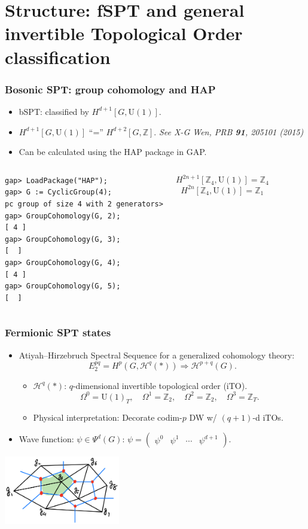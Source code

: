 \documentclass[xcolor=table, aspectratio=169]{beamer}
\newcommand{\uone}{\mathrm U(1)}
\begin{document}
\section{Structure: fSPT and general invertible Topological Order classification}

\begin{frame}[fragile]
	\frametitle{Bosonic SPT: group cohomology and HAP}
	\begin{itemize}
		\item bSPT: classified by $H^{d+1}[G,\uone]$.
		\item $H^{d+1}[G,\uone]$ ``='' $H^{d+2}[G,\mathbb Z]$. \emph{See X-G Wen, PRB \textbf{91}, 205101 (2015)}
                \item Can be calculated using the HAP package in GAP.
	\end{itemize}
	\begin{columns}
	\begin{lstlisting}[basicstyle=\footnotesize]
gap> LoadPackage("HAP");
gap> G := CyclicGroup(4);
pc group of size 4 with 2 generators>
gap> GroupCohomology(G, 2);
[ 4 ]
gap> GroupCohomology(G, 3);
[  ]
gap> GroupCohomology(G, 4);
[ 4 ]
gap> GroupCohomology(G, 5);
[  ]
\end{lstlisting}
	\[H^{2n+1}[\mathbb Z_4,\uone] = \mathbb Z_4\]
	\[H^{2n}[\mathbb Z_4,\uone] = \mathbb Z_1\]
	\end{columns}
\end{frame}

\begin{frame}
  \frametitle{Fermionic SPT states}
  \begin{itemize}
  \item Atiyah–Hirzebruch Spectral Sequence for a generalized cohomology theory:
    \[E_2^{pq} = H^p(G, \mathcal H^q(*)) \Rightarrow \mathcal H^{p+q}(G).\]
    \begin{itemize}
    \item $\mathcal H^q(*)$: $q$-dimensional invertible topological order (iTO).
    \[\Omega^0=\uone_T,\quad\Omega^1=\mathbb Z_2,\quad\Omega^2=\mathbb Z_2,\quad\Omega^3=\mathbb Z_T.\]
    \item Physical interpretation: Decorate codim-$p$ DW w/ $(q+1)$-d iTOs.
    \end{itemize}
  \item Wave function: $\psi\in \Psi^d(G)$: $\psi=\begin{pmatrix}\psi^0&\psi^1&\cdots&\psi^{d+1}\end{pmatrix}$.
  \end{itemize}
  \begin{center}
    \includegraphics[height=3cm]{decoration}
  \end{center}
\end{frame}
\end{document}
